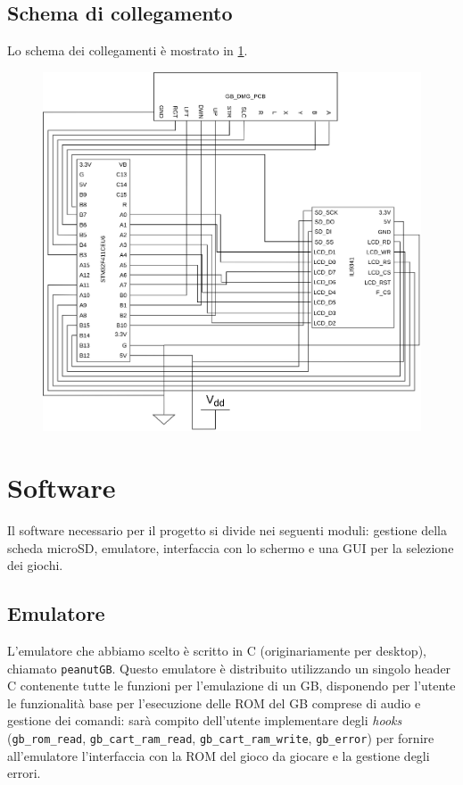 \documentclass[hidelinks,12pt]{article}
\begin{document}
\subsection{Schema di collegamento}
Lo schema dei collegamenti è mostrato in \cref{fig:schema}.
\begin{figure}[h]
	\begin{center}
		\includegraphics[scale=0.7]{figures/scheme.png}
		\caption{}
		\label{fig:schema}
	\end{center}
\end{figure}

\section{Software}
Il software necessario per il progetto si divide nei seguenti moduli: gestione
della scheda microSD, emulatore, interfaccia con lo schermo e una GUI per la
selezione dei giochi.

\subsection{Emulatore}
L'emulatore che abbiamo scelto è scritto in C (originariamente per desktop),
chiamato \texttt{peanutGB}. Questo emulatore è distribuito utilizzando un
singolo header C contenente tutte le funzioni per l'emulazione di un GB,
disponendo per l'utente le funzionalità base per l'esecuzione delle ROM del GB
comprese di audio e gestione dei comandi: sarà compito dell'utente implementare
degli \textit{hooks} (\texttt{gb\_rom\_read}, \texttt{gb\_cart\_ram\_read},
\texttt{gb\_cart\_ram\_write}, \texttt{gb\_error}) per fornire all'emulatore
l'interfaccia con la  ROM del gioco da giocare e la gestione degli errori. 
\end{document}
